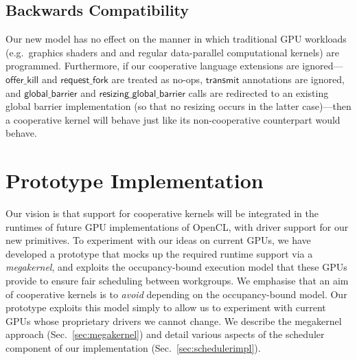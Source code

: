 \documentclass[parskip=half,sigconf,review, anonymous=true, acmcopyrightmode=none]{acmart}
\newcommand{\mysec}{Sec.~}
\newcommand{\transmit}{\mathsf{transmit}}
\newcommand{\offerfork}{\mathsf{request\_fork}}
\newcommand{\offerkill}{\mathsf{offer\_kill}}
\newcommand{\globalbarrier}{\mathsf{global\_barrier}}
\newcommand{\resizingglobalbarrier}{\mathsf{resizing\_global\_barrier}}
\begin{document}



\subsection{Backwards Compatibility}\label{sec:backwardscompatibility}

Our new model has no effect on the manner in which traditional GPU
workloads (e.g.\ graphics shaders and and regular
data-parallel computational kernels) are programmed.
%
Furthermore, if our cooperative language extensions are
ignored---$\offerkill$ and $\offerfork$ are treated as no-ops,
$\transmit$ annotations are ignored, and $\globalbarrier$ and
$\resizingglobalbarrier$ calls are redirected to an existing global
barrier implementation (so that no resizing occurs in the latter
case)---then a cooperative kernel will behave just like its
non-cooperative counterpart would behave.  


\section{Prototype Implementation}\label{sec:implementation}

Our vision is that support for cooperative kernels will be integrated
in the runtimes of future GPU implementations of OpenCL, with driver
support for our new primitives.  To experiment with our ideas on
current GPUs, we have developed a prototype that mocks up the required
runtime support via a \emph{megakernel}, and exploits the
occupancy-bound execution model that these GPUs provide to ensure fair
scheduling between workgroups.  We emphasise that an aim of
cooperative kernels is to \emph{avoid} depending on the
occupancy-bound model.  Our prototype exploits this model simply to
allow us to experiment with current GPUs whose proprietary drivers we
cannot change.  We describe the megakernel approach
(\mysec\ref{sec:megakernel}) and detail various aspects of the
scheduler component of our implementation
(\mysec\ref{sec:schedulerimpl}).
\end{document}
